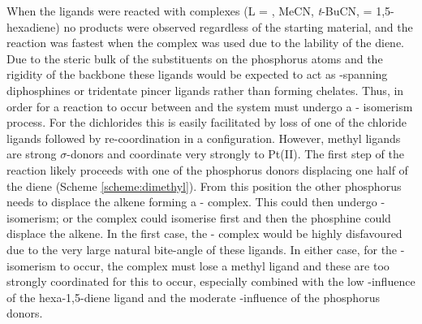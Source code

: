 When the \tBuxantphos{} ligands were reacted with \ce{[PtL2Cl2]} complexes (L = , MeCN, \emph{t}-BuCN,  = 1,5-hexadiene) no \cis{} products were observed regardless of the starting material, and the reaction was fastest when the \cis{} complex \ce{[Pt(C6H10)Cl2]} was used due to the lability of the diene.  Due to the steric bulk of the \tBu{} substituents on the phosphorus atoms and the rigidity of the \tBuxantphos{} backbone these ligands would be expected to act as \trans{}-spanning diphosphines or tridentate \POP{} pincer ligands rather than forming \cis{} chelates.  Thus, in order for a reaction to occur between \tBuxantphos{} and \ce{[Pt(C6H10)Me2]} the system must undergo a \cis-\trans{} isomerism process.  For the dichlorides this is easily facilitated by loss of one of the chloride ligands followed by re-coordination in a \trans{} configuration.  However, methyl ligands are strong $\sigma$-donors and coordinate very strongly to Pt(II).\cite{Appleton1978}  The first step of the reaction likely proceeds with one of the phosphorus donors displacing one half of the diene (Scheme \ref{scheme:dimethyl}).   From this position the other phosphorus needs to displace the alkene forming a \cis{}-\tBuxantphos{} complex.  This could then undergo \cis-\trans{} isomerism; or the complex could isomerise first and then the phosphine could displace the alkene.  In the first case, the \cis-\tBuxantphos{} complex would be highly disfavoured due to the very large natural bite-angle of these ligands.  In either case, for the \cis-\trans{} isomerism to occur, the complex must lose a methyl ligand and these are too strongly coordinated for this to occur, especially combined with the low \trans{}-influence of the hexa-1,5-diene ligand and the moderate \trans{}-influence of the phosphorus donors.\cite{Rigamonti2010, Pregosin1980, Appleton1978}


